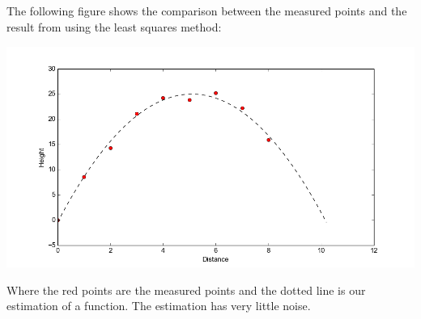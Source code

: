 \documentclass[a4paper]{article}
\begin{document}
\subsection{}
The following figure shows the comparison between the measured points and the result from using the least squares method:
\begin{center}
\includegraphics[scale=0.5]{f1}
\end{center}
Where the red points are the measured points and the dotted line is our estimation of a function. The estimation has very little noise.
\end{document}
